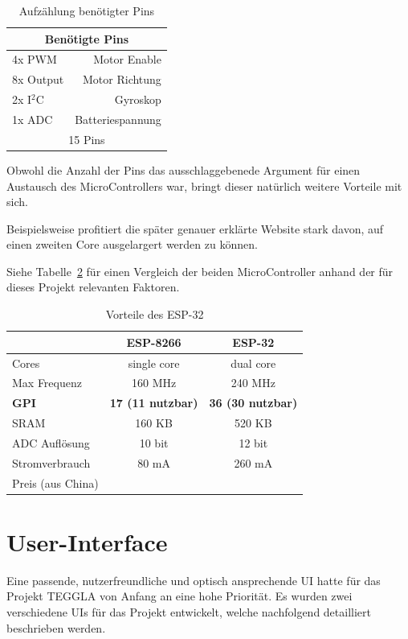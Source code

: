 \begin{table}[!ht]
\centering
\begin{tabular}{lr}
	\multicolumn{2}{c}{Benötigte Pins} \\ 
	\midrule[3pt] 
	4x PWM & Motor Enable \\ 
	\midrule 
	8x Output & Motor Richtung \\ 
	\midrule 
	2x I$^2$C & Gyroskop \\ 
	\midrule 
	1x ADC & Batteriespannung \\ 
	\midrule
	\midrule 
	\multicolumn{2}{c}{15 Pins} \\ 
	 
\end{tabular} 
\caption{Aufzählung benötigter Pins} 
\label{table:pins}
\end{table} 

Obwohl die Anzahl der Pins das ausschlaggebenede Argument für einen Austausch des MicroControllers war, bringt dieser natürlich weitere Vorteile mit sich.

Beispielsweise profitiert die später genauer erklärte Website stark davon, auf einen zweiten Core ausgelargert werden zu können.

Siehe Tabelle~\ref{table:esp32} für einen Vergleich der beiden MicroController anhand der für dieses Projekt relevanten Faktoren.


\begin{table}[!ht]
\centering	
\begin{tabular}{lcc}
	& ESP-8266 & ESP-32 \\ 
	\midrule[3pt]
	Cores & single core & dual core \\ 
	\midrule
	Max Frequenz & 160 MHz & 240 MHz \\ 
	\midrule 
	\textbf{GPI} & \textbf{17 (11 nutzbar)} & \textbf{36 (30 nutzbar)} \\ 
	\midrule
	SRAM & 160 KB & 520 KB \\ 
	\midrule
	ADC Auflösung & 10 bit & 12 bit \\ 
	\midrule
	Stromverbrauch & 80 mA & 260 mA \\ 
	\midrule
	Preis (aus China) & \EUR{2} & \EUR{4} \\ 
\end{tabular} 
\caption{Vorteile des ESP-32} 
\label{table:esp32}
\end{table} 


\section{User-Interface}
Eine passende, nutzerfreundliche und optisch ansprechende UI hatte für das Projekt TEGGLA von Anfang an eine hohe Priorität. Es wurden zwei verschiedene UIs für das Projekt entwickelt, welche nachfolgend detailliert beschrieben werden. 

